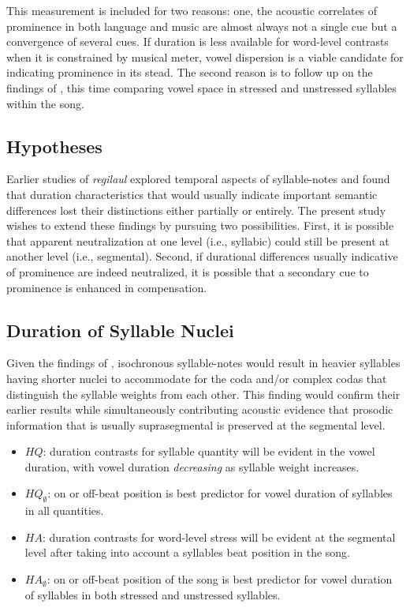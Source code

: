 This measurement is included for two reasons: one, the acoustic correlates of prominence in both language and music are almost always not a single cue but a convergence of several cues. If duration is less available for word-level contrasts when it is constrained by musical meter, vowel dispersion is a viable candidate for indicating prominence in its stead.  The second reason is to follow up on the findings of \citep{ross1989,ross1992}, this time comparing vowel space in stressed and unstressed syllables within the song.  

\subsection{Hypotheses}
Earlier studies of {\it regilaul} explored temporal aspects of syllable-notes and found that duration characteristics that would usually indicate important semantic differences lost their distinctions either partially or entirely. The present study wishes to extend these findings by pursuing two possibilities. First, it is possible that apparent neutralization at one level (i.e., syllabic) could still be present at another level (i.e., segmental). Second, if durational differences usually indicative of prominence are indeed neutralized, it is possible that a secondary cue to prominence is enhanced in compensation. 

\subsection{Duration of Syllable Nuclei}
Given the findings of \citep{rossLehiste2001}, isochronous syllable-notes would result in heavier syllables having shorter nuclei to accommodate for the coda and/or complex codas that distinguish the syllable weights from each other. This finding would confirm their earlier results while simultaneously contributing acoustic evidence that prosodic information that is usually suprasegmental is preserved at the segmental level. 
	\begin{itemize}

	\item \(HQ\): duration contrasts for syllable quantity will be evident in the vowel duration, with vowel duration {\it decreasing} as syllable weight increases.
	\item \(HQ_{\emptyset}\): on or off-beat position is best predictor for vowel duration of syllables in all quantities. 

	\item \(HA\): duration contrasts for word-level stress will be evident at the segmental level after taking into account a syllables beat position in the song. 
	\item \(HA_{\emptyset}\): on or off-beat position of the song is best predictor for vowel duration of syllables in both stressed and unstressed syllables. 

	\end{itemize}

